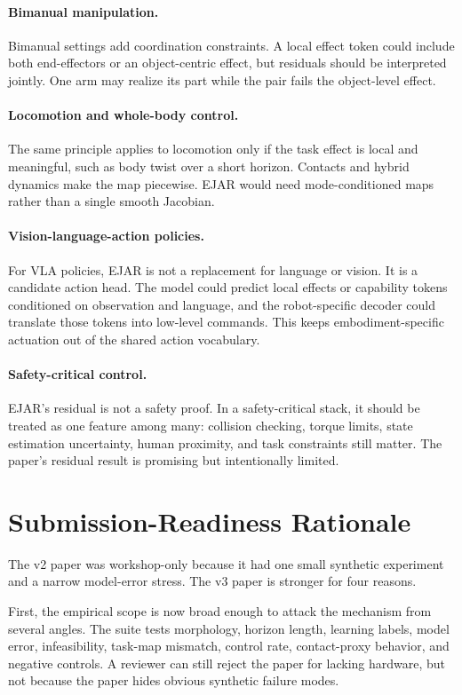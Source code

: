 \documentclass{article}
\begin{document}
\paragraph{Bimanual manipulation.}
Bimanual settings add coordination constraints. A local effect token could include both end-effectors or an object-centric effect, but residuals should be interpreted jointly. One arm may realize its part while the pair fails the object-level effect.

\paragraph{Locomotion and whole-body control.}
The same principle applies to locomotion only if the task effect is local and meaningful, such as body twist over a short horizon. Contacts and hybrid dynamics make the map piecewise. EJAR would need mode-conditioned maps rather than a single smooth Jacobian.

\paragraph{Vision-language-action policies.}
For VLA policies, EJAR is not a replacement for language or vision. It is a candidate action head. The model could predict local effects or capability tokens conditioned on observation and language, and the robot-specific decoder could translate those tokens into low-level commands. This keeps embodiment-specific actuation out of the shared action vocabulary.

\paragraph{Safety-critical control.}
EJAR's residual is not a safety proof. In a safety-critical stack, it should be treated as one feature among many: collision checking, torque limits, state estimation uncertainty, human proximity, and task constraints still matter. The paper's residual result is promising but intentionally limited.

\section{Submission-Readiness Rationale}

The v2 paper was workshop-only because it had one small synthetic experiment and a narrow model-error stress. The v3 paper is stronger for four reasons.

First, the empirical scope is now broad enough to attack the mechanism from several angles. The suite tests morphology, horizon length, learning labels, model error, infeasibility, task-map mismatch, control rate, contact-proxy behavior, and negative controls. A reviewer can still reject the paper for lacking hardware, but not because the paper hides obvious synthetic failure modes.
\end{document}
